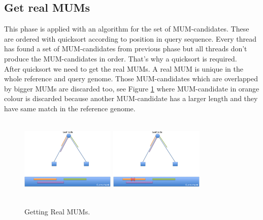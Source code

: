 \documentclass[3p,times]{elsarticle}
\begin{document}
\subsection*{Get real MUMs}
This phase is applied with an algorithm for the set of MUM-candidates. These are ordered with quicksort according to position in query sequence. Every thread has found a set of MUM-candidates from previous phase but all threads don't produce the MUM-candidates in order. That's why a quicksort is required.\\
After quicksort we need to get the real MUMs. A real MUM is unique in the whole reference and query genome. Those MUM-candidates which are overlapped by bigger MUMs are discarded too, see Figure \ref{real-mums} where MUM-candidate in orange colour is discarded because another MUM-candidate has a larger length and they have same match in the reference genome.
\begin{figure}[htb]  
\begin{center} 
  \includegraphics[width=4.5cm,height=4cm]{MUMs.png}
  \includegraphics[width=4.5cm,height=4cm]{Remove-MUMs.png}
\end{center} 
\caption{Getting Real MUMs.} 
\label{real-mums} 
\end{figure}
\end{document}
